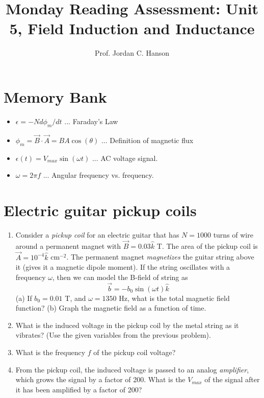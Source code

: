\documentclass{article}
\begin{document}
\title{Monday Reading Assessment: Unit 5, Field Induction and Inductance}
\author{Prof. Jordan C. Hanson}

\maketitle

\section{Memory Bank}

\begin{itemize}
\item $\epsilon = -N d\phi_m /dt$ ... Faraday's Law
\item $\phi_m = \vec{B} \cdot \vec{A} = BA \cos(\theta)$ ... Definition of magnetic flux
\item $\epsilon(t) = V_{max} \sin(\omega t)$ ... AC voltage signal.
\item $\omega = 2\pi f$ ... Angular frequency vs. frequency.
\end{itemize}

\section{Electric guitar pickup coils}

\begin{enumerate}
\item Consider a \textit{pickup coil} for an electric guitar that has $N = 1000$ turns of wire around a permanent magnet with $\vec{B} = 0.03\hat{k}$ T. The area of the pickup coil is $\vec{A} = 10^{-4}\hat{k}$ cm$^{-2}$. The permanent magnet \textit{magnetizes} the guitar string above it (gives it a magnetic dipole moment).  If the string oscillates with a frequency $\omega$, then we can model the B-field of string as
\begin{equation}
\vec{b} = -b_0\sin(\omega t)\hat{k}
\end{equation}
(a) If $b_0 = 0.01$ T, and $\omega = 1350$ Hz, what is the total magnetic field function?  (b) Graph the magnetic field as a function of time. \\ \vspace{2cm}
\item What is the induced voltage in the pickup coil by the metal string as it vibrates? (Use the given variables from the previous problem). \\ \vspace{2cm}
\item What is the frequency $f$ of the pickup coil voltage? \\ \vspace{1cm}
\item From the pickup coil, the induced voltage is passed to an analog \textit{amplifier}, which grows the signal by a factor of 200.  What is the $V_{max}$ of the signal after it has been amplified by a factor of 200?
\end{enumerate}
\end{document}
